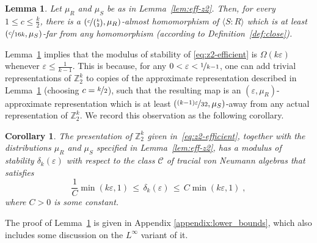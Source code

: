 \documentclass[11pt]{article}
\newtheorem{lemma}[theorem]{Lemma}
\newtheorem{corollary}[theorem]{Corollary}
\theoremstyle{definition}
\newcommand{\Z}{\ensuremath{\mathbb{Z}}}
\newcommand{\eps}{\varepsilon}
\begin{document}
\begin{lemma}\label{lem:lower_bound_on_stability_rate_standard_presentation_Z_2^k}
    Let $\mu_R$ and $\mu_S$ be as in Lemma~\ref{lem:eff-z2}. %
    Then, for every $1\leq c\leq \frac{k}{2}$, there is a $(\nicefrac{c}{\binom{k}{2}},\mu_R)$-almost homomorphism of $\langle S\colon R\rangle$ which is at least  $(\nicefrac{c}{16k},\mu_S)$-far from any homomorphism (according to Definition~\ref{def:close}). 
\end{lemma}


Lemma~\ref{lem:lower_bound_on_stability_rate_standard_presentation_Z_2^k} implies that the modulus of stability of \eqref{eq:z2-efficient} is $\Omega(k\eps)$ whenever $\eps\leq\frac{1}{k-1}$. This is because, for any $0<\eps<\nicefrac{1}{k-1}$, one can add trivial representations of $\Z_2^k$ to copies of the approximate representation described in Lemma~\ref{lem:lower_bound_on_stability_rate_standard_presentation_Z_2^k} (choosing $c=\nicefrac{k}{2}$), such that the resulting map is an $(\eps,\mu_R)$-approximate representation which is at least $(\nicefrac{(k-1)\eps}{32},\mu_S)$-away from any actual representation of $\Z_2^k$. We record this observation as the following corollary.

\begin{corollary}\label{cor:delta-z2k}
The presentation of $\Z_2^k$ given in~\eqref{eq:z2-efficient}, together with the distributions $\mu_R$ and $\mu_S$ specified in Lemma~\ref{lem:eff-z2}, has a modulus of stability  $\delta_k(\eps)$ with respect to the class $\mathcal{C}$ of tracial von Neumann algebras that satisfies
\[ \frac{1}{C} \min(k\eps,1)\,\leq\,\delta_k(\eps)\,\leq\, C\min(k\eps,1)\;,\]
where $C>0$ is some constant.
\end{corollary}

The proof of Lemma~\ref{lem:lower_bound_on_stability_rate_standard_presentation_Z_2^k} is given in Appendix \ref{appendix:lower_bounds}, which also includes some discussion on the $L^\infty$ variant of it. 
\end{document}
